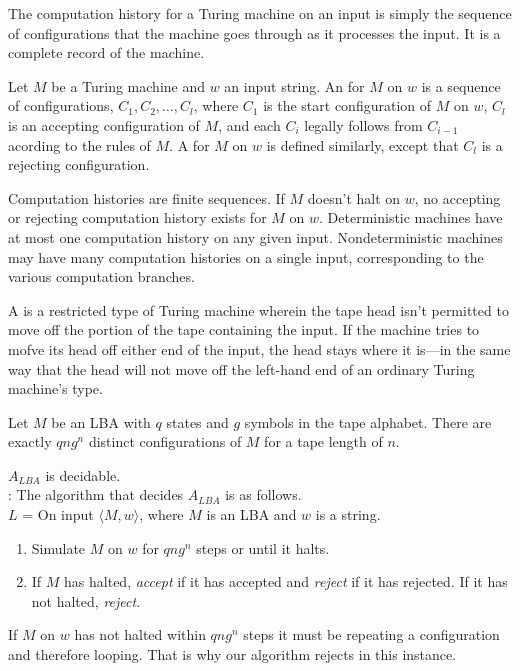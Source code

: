 \documentclass{article}
\begin{document}
The computation history for a Turing machine on an input is simply the sequence of configurations that the machine goes through as it processes the input. It is a complete record of the machine. 

\begin{definition}
  Let $M$ be a Turing machine and $w$ an input string. An  for $M$ on $w$ is a sequence of configurations, $C_1 , C_2 , \dots , C_{l}$, where $C_1$ is the start configuration of $M$ on $w$, $C_l$ is an accepting configuration of $M$, and each $C_i$ legally follows from $C_{i-1}$ acording to the rules of $M$. A  for $M$ on $w$ is defined similarly, except that $C_l$ is a rejecting configuration.
\end{definition}

Computation histories are finite sequences. If $M$ doesn't halt on $w$, no accepting or rejecting computation history exists for $M$ on $w$. Deterministic machines have at most one computation history on any given input. Nondeterministic machines may have many computation histories on a single input, corresponding to the various computation branches. 

\begin{definition}
  A  is a restricted type of Turing machine wherein the tape head isn't permitted to move off the portion of the tape containing the input. If the machine tries to mofve its head off either end of the input, the head stays where it is---in the same way that the head will not move off the left-hand end of an ordinary Turing machine's type. 
\end{definition}

\begin{lemma}
  Let $M$ be an LBA with $q$ states and $g$ symbols in the tape alphabet. There are exactly $qng^{n}$ distinct configurations of $M$ for a tape length of $n$. 
\end{lemma}

\begin{theorem}
  $A_{LBA}$ is decidable. \\ 
  : The algorithm that decides $A_{LBA}$ is as follows. \\ 
  $L$ = On input $\langle M,w \rangle$, where $M$ is an LBA and $w$ is a string. 
  \begin{enumerate}
    \item Simulate $M$ on $w$ for $qng^{n}$ steps or until it halts. 
    \item If $M$ has halted, \emph{accept} if it has accepted and \emph{reject} if it has rejected. If it has not halted, \emph{reject}. 
  \end{enumerate}
  If $M$ on $w$ has not halted within $qng^{n}$ steps it must be repeating a configuration and therefore looping. That is why our algorithm rejects in this instance. 
\end{theorem}
\end{document}
